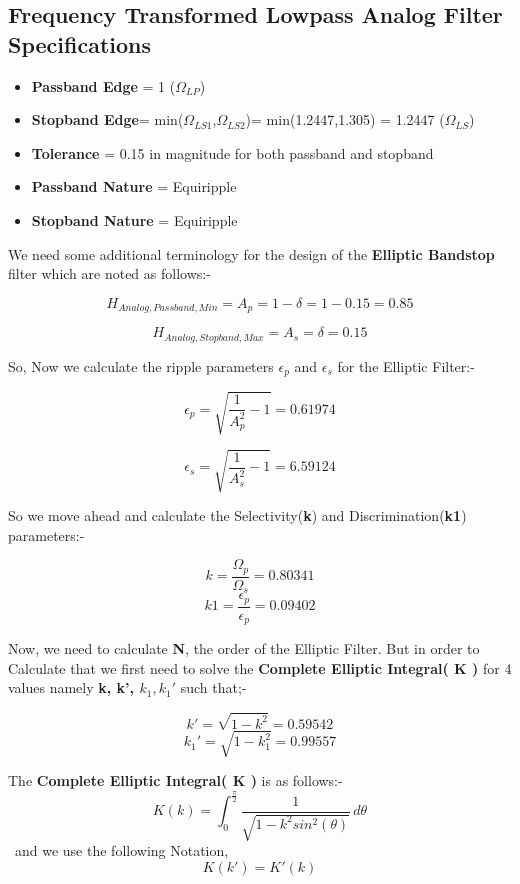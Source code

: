 \documentclass[12pt]{article}
\begin{document}
\subsection{Frequency Transformed Lowpass Analog Filter Specifications}

\begin{itemize}
    \item \textbf{Passband Edge} = 1 ($\Omega_{LP}$)
    \item \textbf{Stopband Edge}= min($\Omega_{LS1}$,$\Omega_{LS2}$)= min(1.2447,1.305) = 1.2447 ($\Omega_{LS}$)
    \item\textbf{Tolerance} = 0.15 in magnitude for both passband and stopband
    \item \textbf{Passband Nature} = Equiripple
    \item \textbf{Stopband Nature} = Equiripple
\end{itemize}

We need some additional terminology for the design of the \textbf{Elliptic Bandstop} filter which are noted as follows:- 


\[H_{Analog,Passband,Min} = A_{p} = 1 - \delta = 1 - 0.15 = 0.85\]

\[H_{Analog,Stopband,Max} = A_{s} = \delta = 0.15\]

So, Now we calculate the ripple parameters $\epsilon_{p}$ and $\epsilon_{s}$ for the Elliptic Filter:-

\[\epsilon_{p} = \sqrt{\frac{1}{A_{p}^2} - 1} = 0.61974\]

\[\epsilon_{s} = \sqrt{\frac{1}{A_{s}^2} - 1} = 6.59124\]

So we move ahead and calculate the Selectivity(\textbf{k}) and Discrimination(\textbf{k1}) parameters:-

\[k = \frac{\Omega_{p}}{\Omega_{s}} = 0.80341\]
\[k1 = \frac{\epsilon_{p}}{\epsilon_{p}} = 0.09402\]

Now, we need to calculate \textbf{N}, the order of the Elliptic Filter. But in order to Calculate that we first need to solve the \textbf{Complete Elliptic Integral( K )} for 4 values namely \textbf{k, k', $k_{1}, k_{1}'$}
such that;-

\[k' = \sqrt{1 - k^{2}} = 0.59542\]
\[k_{1}' = \sqrt{1 - k_{1}^{2}} = 0.99557\]

The \textbf{Complete Elliptic Integral( K )} is as follows:-
\[K(k) = \int_{0}^{\frac{\pi}{2}} \frac{1}{\sqrt{1 - k^{2}sin^{2}(\theta)}} \, d\theta \]\
and we use the following Notation,
\[K(k') = K'(k)\]
\end{document}
